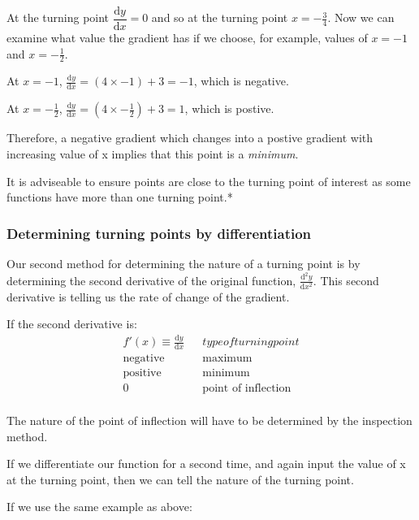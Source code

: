 \documentclass[
]{book}
\begin{document}
At the turning point \(\dfrac{\textrm{d}y}{\textrm{d}x}=0\) and so at the turning point \(x=-\frac{3}{4}\). Now we can examine what value the gradient has if we choose, for example, values of \(x=-1\) and \(x=-\frac{1}{2}\).

At \(x=-1\), \(\frac{\textrm{d}y}{\textrm{d}x} = (4 \times -1)+3 = -1\), which is negative.

At \(x=-\frac{1}{2}\), \(\frac{\textrm{d}y}{\textrm{d}x} = (4 \times -\frac{1}{2})+3 = 1\), which is postive.

Therefore, a negative gradient which changes into a postive gradient with increasing value of x implies that this point is a \emph{minimum}.

It is adviseable to ensure points are close to the turning point of interest as some functions have more than one turning point.*

\hypertarget{determining-turning-points-by-differentiation}{%
\subsubsection{Determining turning points by differentiation}\label{determining-turning-points-by-differentiation}}

Our second method for determining the nature of a turning point is by determining the second derivative of the original function, \(\frac{\textrm{d}^2y}{\textrm{d}x^2}\). This second derivative is telling us the rate of change of the gradient.

If the second derivative is:
\begin{equation*}
\begin{array}{ccc}
  f'(x) \equiv \frac{\textrm{d}y}{\textrm{d}x} & & type of turning point\\
  \hline
\textrm{negative}  & & \textrm{maximum}\\
\textrm{positive} & & \textrm{minimum}\\
0 & & \textrm{point of inflection}\\
\end{array}
\end{equation*}

The nature of the point of inflection will have to be determined by the inspection method.

If we differentiate our function for a second time, and again input the value of x at the turning point, then we can tell the nature of the turning point.

If we use the same example as above:
\end{document}

